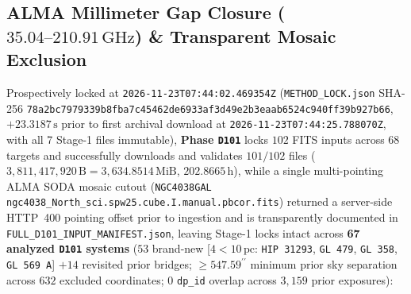 \documentclass[twocolumn,10pt]{article}
\begin{document}
\subsection{ALMA Millimeter Gap Closure ($35.04\text{--}210.91\,\text{GHz}$) \& Transparent Mosaic Exclusion}
Prospectively locked at \texttt{2026-11-23T07:44:02.469354Z} (\texttt{METHOD\_LOCK.json} SHA-256 \texttt{78a2bc79\allowbreak 79339b8f\allowbreak ba7c4546\allowbreak 2de6933a\allowbreak f3d49e2b\allowbreak 3eaab652\allowbreak 4c940ff3\allowbreak 9b927b66}, $+23.3187\,\text{s}$ prior to first archival download at \texttt{2026-11-23T07:44:25.788070Z}, with all 7 Stage-1 files immutable), \textbf{Phase \texttt{D101}} locks $102$ FITS inputs across $68$ targets and successfully downloads and validates $101/102$ files ($3{,}811{,}417{,}920\,\text{B} = 3{,}634.8514\,\text{MiB}$, $202.8665\,\text{h}$), while a single multi-pointing ALMA SODA mosaic cutout (\texttt{NGC4038GAL} \texttt{ngc4038\_North\_\allowbreak sci.\allowbreak spw25.\allowbreak cube.\allowbreak I.manual.\allowbreak pbcor.fits}) returned a server-side HTTP~400 pointing offset prior to ingestion and is transparently documented in \texttt{FULL\_D101\_INPUT\_MANIFEST.json}, leaving Stage-1 locks intact across \textbf{67 analyzed \texttt{D101} systems} ($53$ brand-new [$4 < 10\,\text{pc}$: \texttt{HIP\,31293}, \texttt{GL\,479}, \texttt{GL\,358}, \texttt{GL\,569\,A}] $+ 14$ revisited prior bridges; $\ge 547.59^{\prime\prime}$ minimum prior sky separation across $632$ excluded coordinates; $0$ \texttt{dp\_id} overlap across $3{,}159$ prior exposures):
\end{document}
